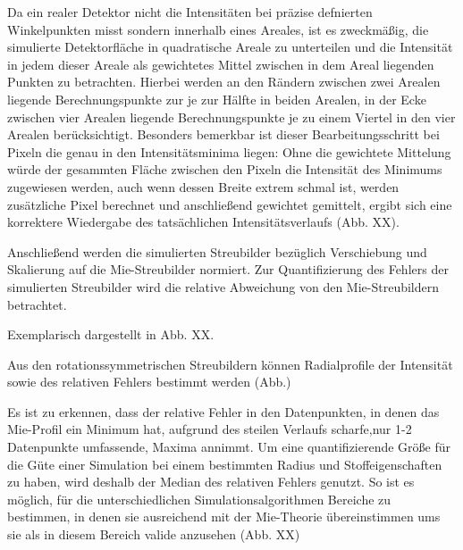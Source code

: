 Da ein realer Detektor nicht die Intensitäten bei präzise defnierten Winkelpunkten misst sondern innerhalb eines Areales, ist es zweckmäßig, die simulierte Detektorfläche in quadratische Areale zu unterteilen und die Intensität in jedem dieser Areale als gewichtetes Mittel zwischen in dem Areal liegenden Punkten zu betrachten.
Hierbei werden an den Rändern zwischen zwei Arealen liegende Berechnungspunkte zur je zur Hälfte in beiden Arealen, in der Ecke zwischen vier Arealen liegende Berechnungspunkte je zu einem Viertel in den vier Arealen berücksichtigt.
Besonders bemerkbar ist dieser Bearbeitungsschritt bei Pixeln die genau in den Intensitätsminima liegen: Ohne die gewichtete Mittelung würde der gesammten Fläche zwischen den Pixeln die Intensität des Minimums zugewiesen werden, auch wenn dessen Breite extrem schmal ist, werden zusätzliche Pixel berechnet und anschließend gewichtet gemittelt, ergibt sich eine korrektere Wiedergabe des tatsächlichen Intensitätsverlaufs (Abb. XX).

Anschließend werden die simulierten Streubilder bezüglich Verschiebung und Skalierung auf die Mie-Streubilder normiert. Zur Quantifizierung des Fehlers der simulierten Streubilder wird die relative Abweichung von den Mie-Streubildern betrachtet.

Exemplarisch dargestellt in Abb. XX.

Aus den rotationssymmetrischen Streubildern können Radialprofile der Intensität sowie des relativen Fehlers bestimmt werden (Abb.)

Es ist zu erkennen, dass der relative Fehler in den Datenpunkten, in denen das Mie-Profil ein Minimum hat, aufgrund des steilen Verlaufs scharfe,nur 1-2 Datenpunkte umfassende, Maxima annimmt.
Um eine quantifizierende Größe für die Güte einer Simulation bei einem bestimmten Radius und Stoffeigenschaften zu haben, wird deshalb der Median des relativen Fehlers genutzt. So ist es möglich, für die unterschiedlichen Simulationsalgorithmen Bereiche zu bestimmen, in denen sie ausreichend mit der Mie-Theorie übereinstimmen ums sie als in diesem Bereich valide anzusehen (Abb. XX)


